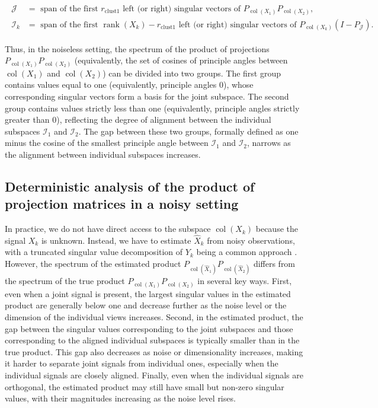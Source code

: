\documentclass{amsart}
\DeclareMathOperator*{\col}{col}
\DeclareMathOperator*{\rank}{rank}
\newcommand{\Jcal}{\mathcal{J}}
\newcommand{\Ical}{\mathcal{I}}
\begin{document}
    \begin{eqnarray*}
    \begin{aligned}
        \mathcal{J} &= \text{ span of the first }r_{\text{clust1}} \text{ left (or right) singular vectors of }P_{\col (X_1)} P_{\col (X_2)},\\
        \mathcal{I}_k &= \text{ span of the first }\rank(X_k)-r_{\text{clust1}} \text{ left (or right) singular vectors of }P_{\col (X_k)}(I-P_{\Jcal}).
        \end{aligned}
    \end{eqnarray*}

Thus, in the noiseless setting, the spectrum of the product of projections $ P_{\col (X_1)} P_{\col (X_2)}$ (equivalently, the set of cosines of principle angles between $\col (X_1)$ and $\col (X_2)$) can be divided into two groups. The first group contains values equal to one (equivalently, principle angles $0$), whose corresponding singular vectors form a basis for the joint subspace. The second group contains values strictly less than one (equivalently, principle angles strictly greater than $0$), reflecting the degree of alignment between the individual subspaces $\Ical_1$ and $\Ical_2$. The gap between these two groups, formally defined as one minus the cosine of the smallest principle angle between $\Ical_1$ and $\Ical_2$, narrows as the alignment between individual subspaces increases. 

\subsection{Deterministic analysis of the product of projection matrices in a noisy setting}\label{sec:noisy}
In practice, we do not have direct access to the subspace $\col(X_k)$ because the signal $X_k$ is unknown. Instead, we have to estimate $\widehat{X}_k$ from noisy observations, with a truncated singular value decomposition of $Y_k$ being a common approach \citep{feng2018angle, shu2019d}. However, the spectrum of the estimated product $P_{\col (\widehat{X}_1)} P_{\col (\widehat{X}_2)}$ differs from the spectrum of the true product $P_{\col (X_1)} P_{\col (X_2)}$ in several key ways.  First, even when a joint signal is present, the largest singular values in the estimated product are generally below one and decrease further as the noise level or the dimension of the individual views increases. Second, in the estimated product, the gap between the singular values corresponding to the joint subspaces and those corresponding to the aligned individual subspaces is typically smaller than in the true product. This gap also decreases as noise or dimensionality increases, making it harder to separate joint signals from individual ones, especially when the individual signals are closely aligned. Finally, even when the individual signals are orthogonal, the estimated product may still have small but non-zero singular values, with their magnitudes increasing as the noise level rises.
\end{document}
